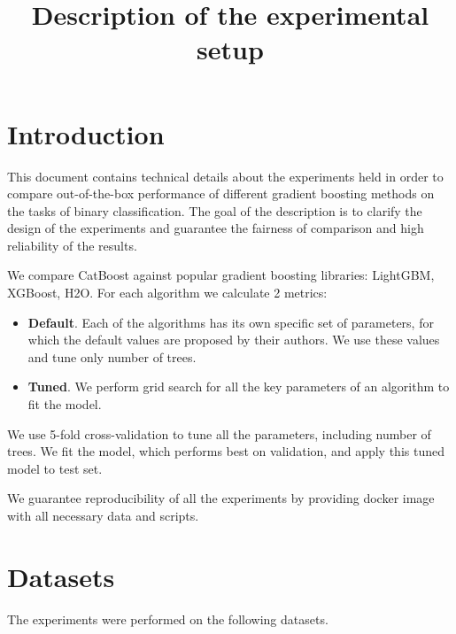 \documentclass{article}
\title{Description of the experimental setup}
\date{}
\begin{document}
\maketitle

\section{Introduction}
This document contains technical details about the experiments held in order to compare out-of-the-box performance of different gradient boosting methods on the tasks of binary classification. The goal of the description is to clarify the design of the experiments and guarantee the fairness of comparison and high reliability of the results.

We compare CatBoost against popular gradient boosting libraries: LightGBM, XGBoost, H2O. For each algorithm we calculate 2 metrics:
\begin{itemize}
\item
{\bfseries Default}. Each of the algorithms has its own specific set of parameters, for which the default values are proposed by their authors. We use these values and tune only number of trees.

\item
{\bfseries Tuned}. We perform grid search for all the key parameters of an algorithm to fit the model.
\end{itemize}

We use 5-fold cross-validation to tune all the parameters, including number of trees. We fit the model, which performs best on validation, and apply this tuned model to test set.

We guarantee reproducibility of all the experiments by providing docker image with all necessary data and scripts.

\section{Datasets}
The experiments were performed on the following datasets.
\end{document}
